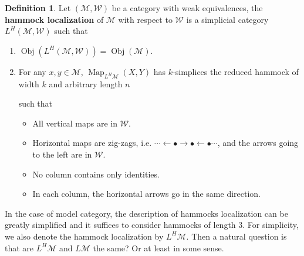 \documentclass[11pt]{amsart}
\numberwithin{equation}{section}
\theoremstyle{definition}
\newtheorem{defn}[thm]{Definition}
\theoremstyle{remark}
\numberwithin{equation}{section}
\newcommand{\CW}{{\mathcal{W}}}
\newcommand{\cm}{{\mathcal{M}}}
\newcommand{\ob}{\operatorname{Obj}}
\newcommand{\map}{\operatorname{Map}}
\begin{document}
\begin{defn}
	Let $(\cm, \CW)$ be a category with weak equivalences, the {\bf hammock localization} of $\cm$ with respect to $\CW$ is a simplicial category $L^H(\cm, \CW)$ such that
		\begin{enumerate}
			\item $\ob (L^H(\cm, \CW))=\ob(\cm)$.
			\item For any $x, y \in \cm$, $\map_{L^H\cm} (X,Y)$ has $k$-simplices the reduced hammock of width $k$ and arbitrary length $n$
		\begin{center}
			such that
			\begin{itemize}
				\item All vertical maps are in $\CW$.
				\item Horizontal maps are zig-zags, i.e. $\cdots \leftarrow \bullet\rightarrow \bullet \leftarrow \bullet \cdots$, and the arrows going to the left are in $\CW$.
				\item No column contains only identities.
				\item In each column, the horizontal arrows go in the same direction. 
			\end{itemize}
		\end{center}
		\end{enumerate}
	In the case of model category, the description of hammocks localization can be greatly simplified and it suffices to consider hammocks of length 3. For simplicity, we also denote the hammock localization by $L^H\cm$. Then a natural question is that are $L^H\cm$ and $L\cm$ the same? Or at least in some sense. 
	

\end{defn}
\end{document}

